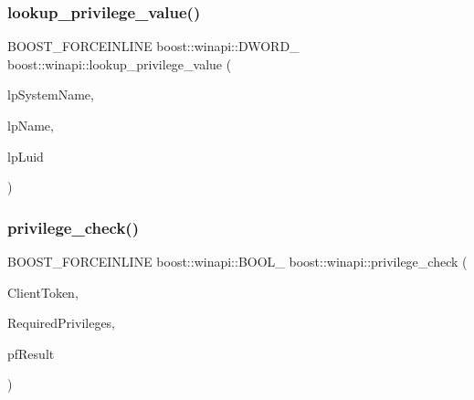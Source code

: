 \mbox{\label{namespaceboost_1_1winapi_a8082af868b44ac9e0c37472e376f0983}} 
\subsubsection{\texorpdfstring{lookup\+\_\+privilege\+\_\+value()}{lookup\_privilege\_value()}\hspace{0.1cm}{\footnotesize\ttfamily [2/2]}}
{\footnotesize\ttfamily B\+O\+O\+S\+T\+\_\+\+F\+O\+R\+C\+E\+I\+N\+L\+I\+NE boost\+::winapi\+::\+D\+W\+O\+R\+D\+\_\+ boost\+::winapi\+::lookup\+\_\+privilege\+\_\+value (\begin{DoxyParamCaption}\item[{boost\+::winapi\+::\+L\+P\+C\+W\+S\+T\+R\+\_\+}]{lp\+System\+Name,  }\item[{boost\+::winapi\+::\+L\+P\+C\+W\+S\+T\+R\+\_\+}]{lp\+Name,  }\item[{\mbox{\hyperlink{namespaceboost_1_1winapi_a9c163fdf2c6f3909b7d5af5652bc6727}{boost\+::winapi\+::\+P\+L\+U\+I\+D\+\_\+}}}]{lp\+Luid }\end{DoxyParamCaption})}

\mbox{\label{namespaceboost_1_1winapi_a90dba32b60ec45a25dfcebada9f019e3}} 
\subsubsection{\texorpdfstring{privilege\+\_\+check()}{privilege\_check()}}
{\footnotesize\ttfamily B\+O\+O\+S\+T\+\_\+\+F\+O\+R\+C\+E\+I\+N\+L\+I\+NE boost\+::winapi\+::\+B\+O\+O\+L\+\_\+ boost\+::winapi\+::privilege\+\_\+check (\begin{DoxyParamCaption}\item[{boost\+::winapi\+::\+H\+A\+N\+D\+L\+E\+\_\+}]{Client\+Token,  }\item[{\mbox{\hyperlink{namespaceboost_1_1winapi_ad5c3207ffbe8cc6eb36b1f28897f2711}{boost\+::winapi\+::\+P\+R\+I\+V\+I\+L\+E\+G\+E\+\_\+\+S\+E\+T\+\_\+}} $\ast$}]{Required\+Privileges,  }\item[{boost\+::winapi\+::\+L\+P\+B\+O\+O\+L\+\_\+}]{pf\+Result }\end{DoxyParamCaption})}

